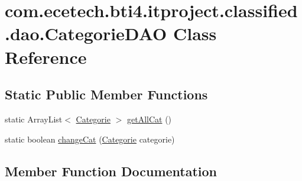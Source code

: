 \hypertarget{classcom_1_1ecetech_1_1bti4_1_1itproject_1_1classified_1_1dao_1_1_categorie_d_a_o}{}\section{com.\+ecetech.\+bti4.\+itproject.\+classified.\+dao.\+Categorie\+D\+AO Class Reference}
\label{classcom_1_1ecetech_1_1bti4_1_1itproject_1_1classified_1_1dao_1_1_categorie_d_a_o}
\subsection*{Static Public Member Functions}
\begin{DoxyCompactItemize}
\item 
static Array\+List$<$ \hyperlink{classcom_1_1ecetech_1_1bti4_1_1itproject_1_1classified_1_1beans_1_1_categorie}{Categorie} $>$ \hyperlink{classcom_1_1ecetech_1_1bti4_1_1itproject_1_1classified_1_1dao_1_1_categorie_d_a_o_a3e7fe47e89b6a9fc25fd8037d3f5acf7}{get\+All\+Cat} ()
\item 
static boolean \hyperlink{classcom_1_1ecetech_1_1bti4_1_1itproject_1_1classified_1_1dao_1_1_categorie_d_a_o_a003d6a6dce5a0c96895c78547931a5ca}{change\+Cat} (\hyperlink{classcom_1_1ecetech_1_1bti4_1_1itproject_1_1classified_1_1beans_1_1_categorie}{Categorie} categorie)
\end{DoxyCompactItemize}


\subsection{Member Function Documentation}
